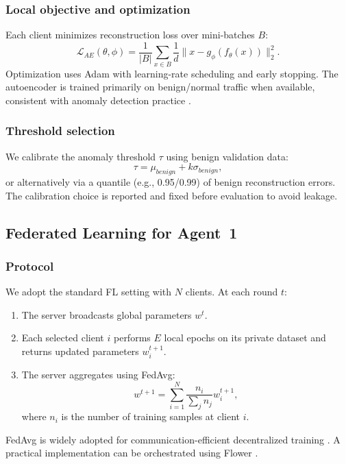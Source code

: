 \documentclass[conference]{IEEEtran}
\begin{document}
\subsubsection{Local objective and optimization}
Each client minimizes reconstruction loss over mini-batches $B$:
\begin{equation}
  \mathcal{L}_{AE}(\theta,\phi) = \frac{1}{|B|}\sum_{x\in B}\frac{1}{d}\lVert x - g_{\phi}(f_{\theta}(x)) \rVert_2^2.
\end{equation}
Optimization uses Adam with learning-rate scheduling and early stopping. The autoencoder is trained primarily on benign/normal traffic when available, consistent with anomaly detection practice \cite{chalapathy2019anomaly}.

\subsubsection{Threshold selection}
We calibrate the anomaly threshold $\tau$ using benign validation data:
\begin{equation}
  \tau = \mu_{benign} + k\sigma_{benign},
\end{equation}
or alternatively via a quantile (e.g., 0.95/0.99) of benign reconstruction errors. The calibration choice is reported and fixed before evaluation to avoid leakage.

\subsection{Federated Learning for Agent~1}
\subsubsection{Protocol}
We adopt the standard FL setting with $N$ clients. At each round $t$:
\begin{enumerate}
  \item The server broadcasts global parameters $w^t$.
  \item Each selected client $i$ performs $E$ local epochs on its private dataset and returns updated parameters $w_i^{t+1}$.
  \item The server aggregates using FedAvg:
  \begin{equation}
    w^{t+1} = \sum_{i=1}^{N} \frac{n_i}{\sum_j n_j} w_i^{t+1},
  \end{equation}
  where $n_i$ is the number of training samples at client $i$.
\end{enumerate}
FedAvg is widely adopted for communication-efficient decentralized training \cite{mcmahan2017fedavg}. A practical implementation can be orchestrated using Flower \cite{beutel2020flower}.
\end{document}
